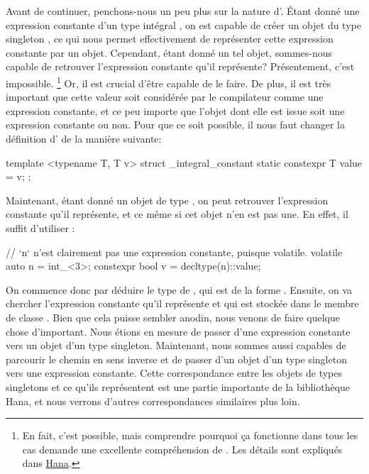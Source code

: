 Avant de continuer, penchons-nous un peu plus sur la nature d'.
Étant donné une expression constante  d'un type intégral , on est
capable de créer un objet du type singleton , ce qui
nous permet effectivement de représenter cette expression constante par un objet.
Cependant, étant donné un tel objet, sommes-nous capable de retrouver l'expression
constante qu'il représente? Présentement, c'est impossible.
\footnote{
    En fait, c'est possible, mais comprendre pourquoi ça fonctionne dans tous
    les cas demande une excellente compréhension de . Les
    détails sont expliqués dans \href{\Hana}{Hana}.
}
Or, il est crucial d'être capable de le faire. De plus, il est très important
que cette valeur soit considérée par le compilateur comme une expression constante,
et ce peu importe que l'objet dont elle est issue soit une expression constante ou
non. Pour que ce soit possible, il nous faut changer la définition
d' de la manière suivante:
\begin{cpp}
    template <typename T, T v>
    struct _integral_constant {
        static constexpr T value = v;
    };
\end{cpp}

Maintenant, étant donné un objet de type , on
peut retrouver l'expression constante qu'il représente, et ce même si cet objet
n'en est pas une. En effet, il suffit d'utiliser :
\begin{cpp}
    // `n` n'est clairement pas une expression constante, puisque volatile.
    volatile auto n = int_<3>;
    constexpr bool v = decltype(n)::value;
\end{cpp}

On commence donc par déduire le type de , qui est de la forme
. Ensuite, on va chercher l'expression
constante qu'il représente et qui est stockée dans le membre de classe
. Bien que cela puisse sembler anodin, nous venons de faire
quelque chose d'important. Nous étions en mesure de passer d'une expression
constante vers un objet d'un type singleton. Maintenant, nous sommes aussi
capables de parcourir le chemin en sens inverse et de passer d'un objet d'un
type singleton vers une expression constante. Cette correspondance entre les
objets de types singletons et ce qu'ils représentent est une partie importante
de la bibliothèque Hana, et nous verrons d'autres correspondances similaires
plus loin.


